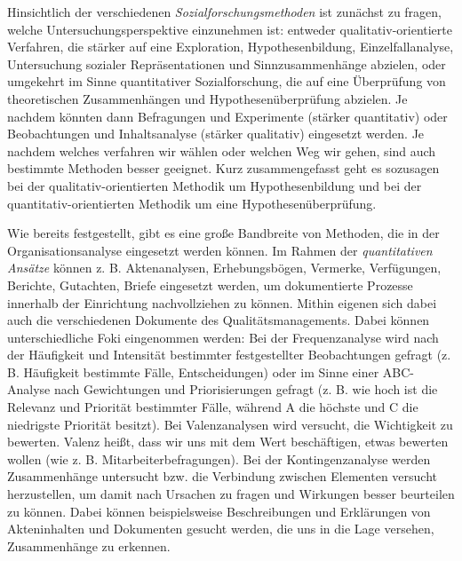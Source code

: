 \documentclass[
  letterpaper,
]{book}
\begin{document}
Hinsichtlich der verschiedenen \emph{Sozialforschungsmethoden} ist
zunächst zu fragen, welche Untersuchungsperspektive einzunehmen ist:
entweder qualitativ-orientierte Verfahren, die stärker auf eine
Exploration, Hypothesenbildung, Einzelfallanalyse, Untersuchung sozialer
Repräsentationen und Sinnzusammenhänge abzielen, oder umgekehrt im Sinne
quantitativer Sozialforschung, die auf eine Überprüfung von
theoretischen Zusammenhängen und Hypothesenüberprüfung abzielen. Je
nachdem könnten dann Befragungen und Experimente (stärker quantitativ)
oder Beobachtungen und Inhaltsanalyse (stärker qualitativ) eingesetzt
werden. Je nachdem welches verfahren wir wählen oder welchen Weg wir
gehen, sind auch bestimmte Methoden besser geeignet. Kurz
zusammengefasst geht es sozusagen bei der qualitativ-orientierten
Methodik um Hypothesenbildung und bei der quantitativ-orientierten
Methodik um eine Hypothesenüberprüfung.

Wie bereits festgestellt, gibt es eine große Bandbreite von Methoden,
die in der Organisationsanalyse eingesetzt werden können. Im Rahmen der
\emph{quantitativen Ansätze} können z. B. Aktenanalysen, Erhebungsbögen,
Vermerke, Verfügungen, Berichte, Gutachten, Briefe eingesetzt werden, um
dokumentierte Prozesse innerhalb der Einrichtung nachvollziehen zu
können. Mithin eigenen sich dabei auch die verschiedenen Dokumente des
Qualitätsmanagements. Dabei können unterschiedliche Foki eingenommen
werden: Bei der Frequenzanalyse wird nach der Häufigkeit und Intensität
bestimmter festgestellter Beobachtungen gefragt (z. B. Häufigkeit
bestimmte Fälle, Entscheidungen) oder im Sinne einer ABC-Analyse nach
Gewichtungen und Priorisierungen gefragt (z. B. wie hoch ist die
Relevanz und Priorität bestimmter Fälle, während A die höchste und C die
niedrigste Priorität besitzt). Bei Valenzanalysen wird versucht, die
Wichtigkeit zu bewerten. Valenz heißt, dass wir uns mit dem Wert
beschäftigen, etwas bewerten wollen (wie z. B. Mitarbeiterbefragungen).
Bei der Kontingenzanalyse werden Zusammenhänge untersucht bzw. die
Verbindung zwischen Elementen versucht herzustellen, um damit nach
Ursachen zu fragen und Wirkungen besser beurteilen zu können. Dabei
können beispielsweise Beschreibungen und Erklärungen von Akteninhalten
und Dokumenten gesucht werden, die uns in die Lage versehen,
Zusammenhänge zu erkennen.
\end{document}
